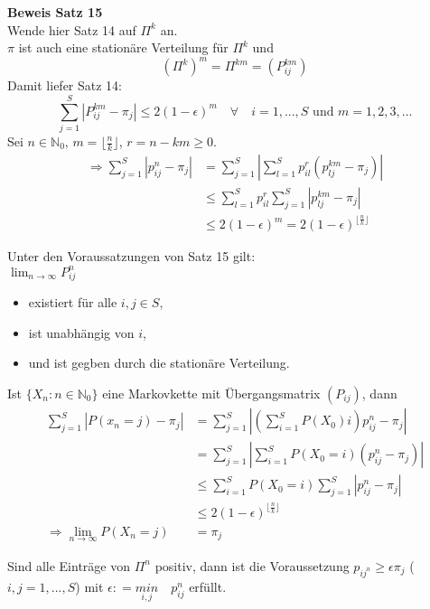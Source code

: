 \documentclass[a4paper,12pt]{article}
\begin{document}
\textbf{Beweis Satz 15}\\
Wende hier Satz 14 auf $\Pi^k$ an.\\
$\pi$ ist auch eine stationäre Verteilung für $\Pi^k$ und 
$$
(\Pi^k)^m = \Pi^{km} = (P_{ij}^{km})
$$
Damit liefer Satz 14:
$$
\sum_{j=1}^{S} |   P_{ij}^{km} - \pi_j | \leq 2(1-\epsilon)^m \quad \forall \quad i = 1, ..., S \text{ und } m = 1, 2, 3, ... 
$$
Sei $n \in \mathbb{N}_0$, $m = \lfloor \frac{n}{k} \rfloor$, $r = n - km \geq 0$.
\begin{align*}
\Rightarrow \sum_{j=1}^{S} | p_{ij}^n - \pi_j   | & = \sum_{j=1}^{S} | \sum_{l=1}^{S}p_{il}^{r}(p_{lj}^{km} - \pi_j)    |\\
& \leq \sum_{l=1}^{S}p_{il}^r \sum_{j=1}^{S}|p_{lj}^{km} - \pi_j   | \\
& \leq 2(1-\epsilon)^m = 2(1-\epsilon)^{\lfloor\frac{n}{k} \rfloor}
\end{align*}


Unter den Voraussatzungen von Satz 15 gilt:\\
$\lim_{n \to \infty}P_{ij}^n$
\begin{itemize}
	\item existiert für alle $i,j \in S$,
	\item ist unabhängig von $i$,
	\item und ist gegben durch die stationäre Verteilung.
\end{itemize}


Ist $\{X_n: n \in \mathbb{N}_0\}$ eine Markovkette mit Übergangsmatrix $(P_{ij})$, dann
\begin{align*}
\sum_{j=1}^{S} | P(x_n = j) - \pi_j   | & = \sum_{j=1}^{S} | (\sum_{i=1}^{S}P(X_0 ) i)p_{ij}^n - \pi_j   | \\
& = \sum_{j=1}^{S}|\sum_{i=1}^{S} P(X_0 = i)(p_{ij}^n - \pi_j)  | \\
& \leq \sum_{i=1}^{S}P(X_0 = i)\sum_{j=1}^{S} |p_{ij}^n - \pi_j   | \\
& \leq 2(1-\epsilon)^{\lfloor\frac{n}{k} \rfloor} \\
\Rightarrow \lim_{n \to \infty}P(X_n = j) & = \pi_j
\end{align*}


Sind alle Einträge von $\Pi^n$ positiv, dann ist die Voraussetzung $p_{ij^n} \geq \epsilon \pi_j$ ($i,j = 1, ..., S$)
mit $\epsilon: = \underset{i,j}{min} \quad p_{ij}^n$ erfüllt. 
\end{document}
